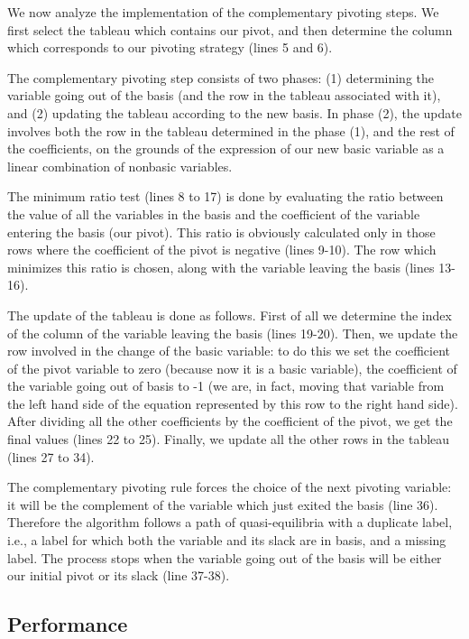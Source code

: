 \documentclass[11pt]{article}
\begin{document}
We now analyze the implementation of the complementary pivoting
steps. We first select the tableau which contains our pivot, and
then determine the column which corresponds to our pivoting strategy
(lines 5 and 6).

The complementary pivoting step consists of two phases: (1)
determining the variable going out of the basis (and the row in the
tableau associated with it), and (2) updating the tableau according
to the new basis. In phase (2), the update involves both the row in
the tableau determined in the phase (1), and the rest of the
coefficients, on the grounds of the expression of our new basic
variable as a linear combination of nonbasic variables.

The minimum ratio test (lines 8 to 17) is done by evaluating the
ratio between the value of all the variables in the basis and the
coefficient of the variable entering the basis (our pivot). This
ratio is obviously calculated only in those rows where the
coefficient of the pivot is negative (lines 9-10). The row which
minimizes this ratio is chosen, along with the variable leaving the
basis (lines 13-16).

The update of the tableau is done as follows. First of all we
determine the index of the column of the variable leaving the basis
(lines 19-20). Then, we update the row involved in the change of the
basic variable: to do this we set the coefficient of the pivot
variable to zero (because now it is a basic variable), the
coefficient of the variable going out of basis to -1 (we are, in
fact, moving that variable from the left hand side of the equation
represented by this row to the right hand side). After dividing all
the other coefficients by the coefficient of the pivot, we get the
final values (lines 22 to 25). Finally, we update all the other rows
in the tableau (lines 27 to 34).

The complementary pivoting rule forces the choice of the next
pivoting variable: it will be the complement of the variable which
just exited the basis (line 36). Therefore the algorithm follows a
path of quasi-equilibria with a duplicate label, i.e., a label for
which both the variable and its slack are in basis, and a missing
label. The process stops when the variable going out of the basis
will be either our initial pivot or its slack (line 37-38).

\subsection{Performance}
\end{document}
